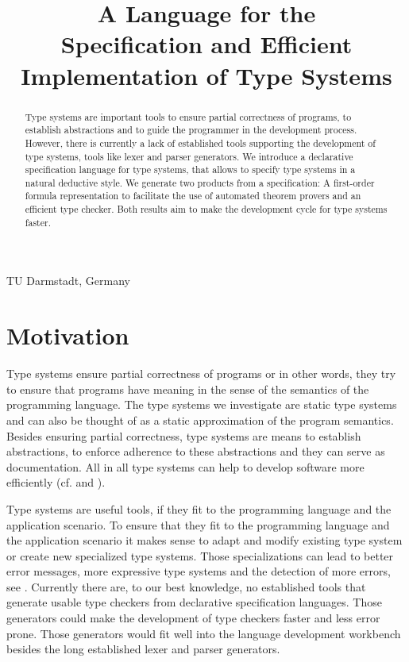 \documentclass[preprint]{sigplanconf}
\begin{document}
\title{A Language for the \\ Specification and Efficient Implementation
  of Type Systems}

           {TU Darmstadt, Germany}
           {}
\maketitle

\begin{abstract}
  Type systems are important tools to ensure partial correctness of
  programs, to establish abstractions and to guide the programmer in
  the development process. However, there is currently a lack of
  established tools supporting the development of type systems, tools
  like lexer and parser generators. We introduce a declarative
  specification language for type systems, that allows to specify type
  systems in a natural deductive style. We generate two products from
  a specification: A first-order formula representation to facilitate
  the use of automated theorem provers and an efficient type
  checker. Both results aim to make the development cycle for type
  systems faster.
 \end{abstract}

\section{Motivation}
Type systems ensure partial correctness of programs or in other words,
they try to ensure that programs have meaning in the sense of the
semantics of the programming language. The type systems we investigate
are static type systems and can also be thought of as a static
approximation of the program semantics. Besides ensuring partial
correctness, type systems are means to establish abstractions, to
enforce adherence to these abstractions and they can serve as
documentation. All in all type systems can help to develop software
more efficiently (cf. \cite{Petersen:2014:ECS:2597008.2597152} and
\cite{Mayer:2012:ESI:2384616.2384666}).

Type systems are useful tools, if they fit to the programming language
and the application scenario. To ensure that they fit to the
programming language and the application scenario it makes sense to
adapt and modify existing type system or create new specialized type
systems. Those specializations can lead to better error messages, more
expressive type systems and the detection of more
errors, see \cite{Thiemann02programmabletype}. Currently there are, to our
best knowledge, no established tools that generate usable type
checkers from declarative specification languages. Those generators
could make the development of type checkers faster and less error
prone. Those generators would fit well into the language development
workbench besides the long established lexer and parser generators.
\end{document}

